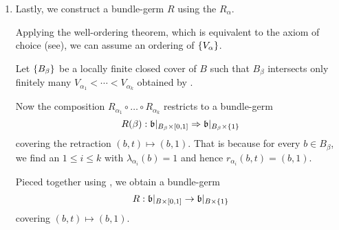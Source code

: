 \begin{scope}
\begin{myproof}
\begin{enumerate}
            \item
            Lastly, we construct a bundle-germ $R$ using the $R_\alpha$.

            Applying the well-ordering theorem,
            which is equivalent to the axiom of choice (see\cite[p.14]{kuczma}),
            we can assume an ordering of $\{V_\alpha\}$.

            Let $\{B_\beta\}$ be a locally finite closed cover of $B$
            such that $B_\beta$ intersects only
            finitely many $V_{\alpha_1} < \cdots < V_{\alpha_k}$
            obtained by .

            Now the composition
            $R_{\alpha_1} \circ \ldots \circ R_{\alpha_k}$ restricts to a bundle-germ 
            \[ \germdef{R(\beta)}{\bb[\cyl{B_\beta}]}{\bb[\cylup{B_\beta}]} \]
            covering the retraction $(b, t) \mapsto (b, 1)$.
            That is because for every $b \in B_\beta$,
            we find an $1 \le i \le k$ with
            $\lambda_{\alpha_i}(b) = 1$ and hence $r_{\alpha_i}(b, t) = (b, 1)$.
            
            Pieced together using ,
            we obtain a bundle-germ
            \[ R: \bb[\cyl{B}] \to \bb[\cylup{B}] \]
            covering $(b, t) \mapsto (b, 1)$.
        \end{enumerate}    
    \end{myproof}
\end{scope}